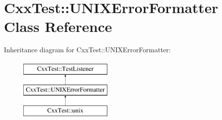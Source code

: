 \hypertarget{classCxxTest_1_1UNIXErrorFormatter}{\section{Cxx\-Test\-:\-:U\-N\-I\-X\-Error\-Formatter Class Reference}
\label{classCxxTest_1_1UNIXErrorFormatter}
}
Inheritance diagram for Cxx\-Test\-:\-:U\-N\-I\-X\-Error\-Formatter\-:\begin{figure}[H]
\begin{center}
\leavevmode
\includegraphics[height=3.000000cm]{classCxxTest_1_1UNIXErrorFormatter}
\end{center}
\end{figure}
